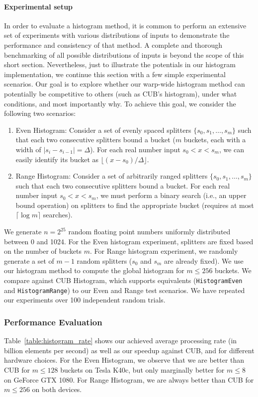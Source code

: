 \paragraph{Experimental setup}
In order to evaluate a histogram method, it is common to perform an extensive set of experiments with various distributions of inputs to demonstrate the performance and consistency of that method.
A complete and thorough benchmarking of all possible distributions of inputs is beyond the scope of this short section.
Nevertheless, just to illustrate the potentials in our histogram implementation, we continue this section with a few simple experimental scenarios.
Our goal is to explore whether our warp-wide histogram method can potentially be competitive to others (such as CUB's histogram), under what conditions, and most importantly why.
To achieve this goal, we consider the following two scenarios:
\begin{enumerate}
        \item Even Histogram: Consider a set of evenly spaced splitters $\{s_0, s_1, \dots, s_{m}\}$ such that each two consecutive splitters bound a bucket ($m$ buckets, each with a width of $|s_i - s_{i-1}| = \Delta$). For each real number input $s_0 < x < s_m$, we can easily identify its bucket as $\lfloor(x-s_0)/\Delta\rfloor$.
        \item Range Histogram: Consider a set of arbitrarily ranged splitters $\{s_0, s_1, \dots, s_{m}\}$ such that each two consecutive splitters bound a bucket. For each real number input $s_0 < x < s_m$, we must perform a binary search (i.e., an upper bound operation) on splitters to find the appropriate bucket (requires at most $\lceil \log m \rceil$ searches).
\end{enumerate}

We generate $n=2^{25}$ random floating point numbers uniformly distributed between 0 and 1024. For the Even histogram experiment, splitters are fixed based on the number of buckets $m$. For Range histogram experiment, we randomly generate a set of $m-1$ random splitters ($s_0$ and $s_m$ are already fixed).
We use our histogram method to compute the global histogram for $m\leq 256$ buckets. We compare against CUB Histogram, which supports equivalents  (\texttt{HistogramEven} and \texttt{HistogramRange}) to our Even and Range test scenarios.
We have repeated our experiments over 100 independent random trials.

\subsubsection{Performance Evaluation}
Table~\ref{table:histogram_rate} shows our achieved average processing rate (in billion elements per second) as well as our speedup against CUB, and for different hardware choices.
For the Even Histogram, we observe that we are better than CUB for $m\leq 128$ buckets on Tesla K40c, but only marginally better for $m\leq 8$ on GeForce GTX 1080. For Range Histogram, we are always better than CUB for $m\leq 256$ on both devices.

